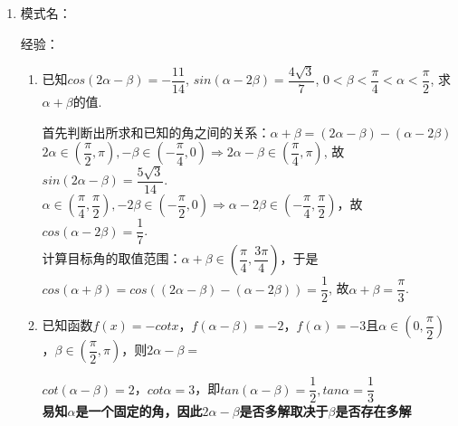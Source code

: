 \begin{enumerate}
\begin{enumerate}
        \item 求$y = \dfrac{sinx \cdot cosx}{1 + sinx + cosx}$的值域.
        \begin{jieda}
            设$t = sinx+cosx, t \in [-\sqrt{2}, -1) \cup (-1, \sqrt{2}]$，则$sinx \cdot cosx = \dfrac{t^2-1}{2}$，故$y = \dfrac{t^2-1}{2(1+t)} = \dfrac{t-1}{2}$，故值域为$\left[\dfrac{-\sqrt{2}-1}{2}, -1\right) \cup \left(-1, \dfrac{\sqrt{2}-1}{2}\right]$
        \end{jieda}
    \end{enumerate}
    \item 
    模式名：

    经验：

    \begin{enumerate}
        \item 已知$cos(2\alpha-\beta)=-\dfrac{11}{14}$, $sin(\alpha-2\beta)=\dfrac{4\sqrt{3}}{7}$, 
        $0<\beta<\dfrac{\pi}{4}<\alpha<\dfrac{\pi}{2}$, 求$\alpha+\beta$的值. 
        \begin{jieda}
        首先判断出所求和已知的角之间的关系：$\alpha+\beta = (2\alpha-\beta)-(\alpha-2\beta)$ \\
        $2\alpha \in \left(\dfrac{\pi}{2}, \pi \right), -\beta \in \left(-\dfrac{\pi}{4}, 0 \right) \Rightarrow 2\alpha-\beta \in \left(\dfrac{\pi}{4}, \pi \right)$, 故$sin(2\alpha-\beta)=\dfrac{5\sqrt{3}}{14}$. \\
        $\alpha \in \left(\dfrac{\pi}{4}, \dfrac{\pi}{2} \right), -2\beta \in \left(-\dfrac{\pi}{2}, 0 \right) \Rightarrow \alpha-2\beta \in \left(-\dfrac{\pi}{4}, \dfrac{\pi}{2} \right)$，故$cos(\alpha-2\beta)=\dfrac{1}{7}$. \\
        计算目标角的取值范围：$\alpha+\beta\in\left(\dfrac{\pi}{4},\dfrac{3\pi}{4}\right)$，于是$cos(\alpha+\beta)=cos((2\alpha-\beta)-(\alpha-2\beta))=\dfrac{1}{2}$, 故$\alpha+\beta=\dfrac{\pi}{3}$. 
        \end{jieda}
        \item 已知函数$f(x) = -cotx$，$f(\alpha - \beta) = -2$，$f(\alpha) = -3$且$\alpha \in (0, \dfrac{\pi}{2})$，$\beta \in (\dfrac{\pi}{2}, \pi)$，则$2\alpha - \beta = $
        \begin{jieda}
            $cot(\alpha - \beta) = 2$，$cot\alpha = 3$，即$tan(\alpha - \beta) = \dfrac{1}{2}, tan\alpha = \dfrac{1}{3}$\\
            \textbf{易知$\alpha$是一个固定的角，因此$2\alpha - \beta$是否多解取决于$\beta$是否存在多解} \\

\end{jieda}
\end{enumerate}
\end{enumerate}
